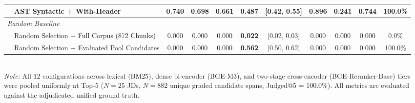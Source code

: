 \begin{table}[t]
\begin{tabular}{llccccccccc}
  & AST Syntactic + With-Header    & 0.740 & 0.698 & 0.661 & \textbf{0.487} & [0.42, 0.55] & 0.896 & 0.241 & 0.744 & 100.0\% \\
\midrule
\multicolumn{11}{l}{\textit{Random Baseline}} \\
  & Random Selection + Full Corpus (872 Chunks) & 0.000 & 0.000 & 0.000 & \textbf{0.022} & [0.02, 0.03] & 0.000 & 0.000 & 0.000 & 0.0\% \\
  & Random Selection + Evaluated Pool Candidates & 0.000 & 0.000 & 0.000 & \textbf{0.562} & [0.50, 0.62] & 0.000 & 0.000 & 0.000 & 100.0\% \\
\bottomrule
\end{tabular}
\vspace{1mm}\\
\footnotesize{\textit{Note:} All 12 configurations across lexical (BM25), dense bi-encoder (BGE-M3), and two-stage cross-encoder (BGE-Reranker-Base) tiers were pooled uniformly at Top-5 ($N=25$ JDs, $N=882$ unique graded candidate spans, Judged@5 = 100.0\%). All metrics are evaluated against the adjudicated unified ground truth.}
\vspace{-2mm}
\end{table}